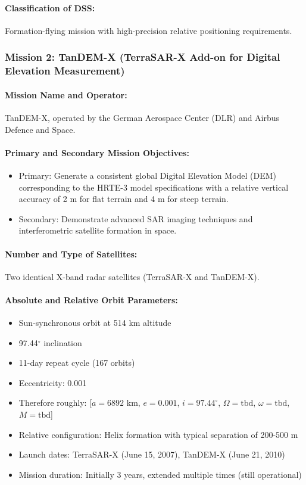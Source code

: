 \paragraph{Classification of DSS:}
Formation-flying mission with high-precision relative positioning requirements.

\subsubsection{Mission 2: TanDEM-X (TerraSAR-X Add-on for Digital Elevation Measurement)}

\paragraph{Mission Name and Operator:} 
TanDEM-X, operated by the German Aerospace Center (DLR) and Airbus Defence and Space.

\paragraph{Primary and Secondary Mission Objectives:}
\begin{itemize}
    \item Primary: Generate a consistent global Digital Elevation Model (DEM) corresponding to the HRTE-3 model specifications with a relative vertical accuracy of 2 m for flat terrain and 4 m for steep terrain.
    \item Secondary: Demonstrate advanced SAR imaging techniques and interferometric satellite formation in space.
\end{itemize}

\paragraph{Number and Type of Satellites:} 
Two identical X-band radar satellites (TerraSAR-X and TanDEM-X).

\paragraph{Absolute and Relative Orbit Parameters:}
\begin{itemize}
    \item Sun-synchronous orbit at 514 km altitude
    \item 97.44$^{\circ}$ inclination
    \item 11-day repeat cycle (167 orbits)
    \item Eccentricity: 0.001
    \item Therefore roughly: [$a = 6892$ km, $e = 0.001$, $i = 97.44^{\circ}$, $\Omega = \text{tbd}$, $\omega = \text{tbd}$, $M = \text{tbd}$]
    \item Relative configuration: Helix formation with typical separation of 200-500 m
    \item Launch dates: TerraSAR-X (June 15, 2007), TanDEM-X (June 21, 2010)
    \item Mission duration: Initially 3 years, extended multiple times (still operational)
\end{itemize}

